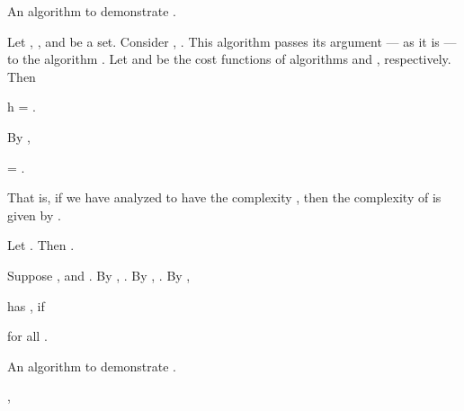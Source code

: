 \documentclass[b5paper, english, oneside]{memoir}
\begin{document}
\begin{algorithm}
\caption{An algorithm to demonstrate .}
\label{alg:restriction}
\begin{algorithmic}[1]
\State \Return {}
\EndProcedure
\end{algorithmic}
\end{algorithm}

\begin{example}
Let , , and  be a set. Consider , . This algorithm passes its argument --- as it is --- to the algorithm . Let  and  be the cost functions of algorithms  and , respectively. Then
\begin{eqs}
h = .
\end{eqs}
By ,
\begin{eqs}
 = .
\end{eqs}
That is, if we have analyzed  to have the complexity , then the complexity of  is given by .
\end{example}

\begin{example}

\end{example}

\begin{example}
Let . Then .
\end{example}

\begin{example}

\end{example}

\begin{example}
Suppose , and . By , . By , . By ,  
\end{example}

\begin{definition}
 has , if

for all .
\end{definition}

\begin{algorithm}
\caption{An algorithm to demonstrate .}
\label{alg:sequence}
\begin{algorithmic}[1]
\State \Return {}, 
\EndProcedure
\end{algorithmic}
\end{algorithm}
\end{document}
